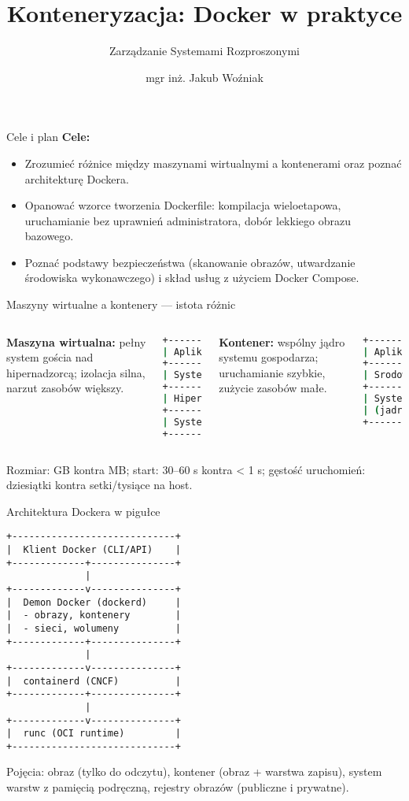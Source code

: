 \documentclass[10pt, aspectratio=169]{beamer}
\author[J. Woźniak]{mgr inż. Jakub Woźniak}
\institute[PUT]{Politechnika Poznańska\\Wydział Informatyki i Telekomunikacji}
\date{}
\title{Konteneryzacja: Docker w praktyce}
\subtitle{Zarządzanie Systemami Rozproszonymi}
\begin{document}
\frame{\titlepage}

\begin{frame}{Cele i plan}
\textbf{Cele:}
\begin{itemize}
  \item Zrozumieć różnice między maszynami wirtualnymi a kontenerami oraz poznać architekturę Dockera.
  \item Opanować wzorce tworzenia Dockerfile: kompilacja wieloetapowa, uruchamianie bez uprawnień administratora, dobór lekkiego obrazu bazowego.
  \item Poznać podstawy bezpieczeństwa (skanowanie obrazów, utwardzanie środowiska wykonawczego) i skład usług z użyciem Docker Compose.
\end{itemize}


\end{frame}

\begin{frame}[fragile]{Maszyny wirtualne a kontenery — istota różnic}
\begin{columns}[T]
\textbf{Maszyna wirtualna:} pełny system gościa nad hipernadzorcą; izolacja silna, narzut zasobów większy.
\begin{lstlisting}[language=bash]
+------------------+
| Aplikacje        |
+------------------+
| System goscia    | (GB)
+------------------+
| Hipernadzorca    |
+------------------+
| System gospodarza|
+------------------+
\end{lstlisting}

\textbf{Kontener:} wspólny jądro systemu gospodarza; uruchamianie szybkie, zużycie zasobów małe.
\begin{lstlisting}[language=bash]
+------------------+
| Aplikacje        | (MB)
+------------------+
| Srodowisko kont. |
+------------------+
| System gospodarza|
| (jadro)          |
+------------------+
\end{lstlisting}
\end{columns}

\medskip
Rozmiar: GB kontra MB; start: 30–60 s kontra < 1 s; gęstość uruchomień: dziesiątki kontra setki/tysiące na host.
\end{frame}

\begin{frame}[fragile]{Architektura Dockera w pigułce}
\begin{lstlisting}[basicstyle=\ttfamily\scriptsize]
+-----------------------------+
|  Klient Docker (CLI/API)    |
+-------------+---------------+
              |
+-------------v---------------+
|  Demon Docker (dockerd)     |
|  - obrazy, kontenery        |
|  - sieci, wolumeny          |
+-------------+---------------+
              |
+-------------v---------------+
|  containerd (CNCF)          |
+-------------+---------------+
              |
+-------------v---------------+
|  runc (OCI runtime)         |
+-----------------------------+
\end{lstlisting}

Pojęcia: obraz (tylko do odczytu), kontener (obraz + warstwa zapisu), system warstw z pamięcią podręczną, rejestry obrazów (publiczne i prywatne).
\end{frame}
\end{document}
